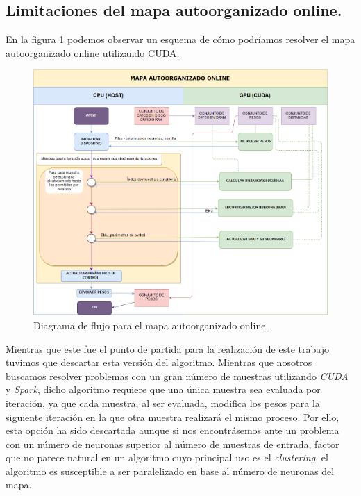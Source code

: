\subsection{Limitaciones del mapa autoorganizado online.}
En la figura \ref{img:somonline} podemos observar un esquema de cómo podríamos resolver el mapa autoorganizado online utilizando CUDA.

\begin{figure}[ht]
\centering
\includegraphics[scale=0.35]{imagenes/flujosomonline.png}
\caption{Diagrama de flujo para el mapa autoorganizado online.}
\label{img:somonline}
\end{figure}

Mientras que este fue el punto de partida para la realización de este trabajo tuvimos que descartar esta versión del algoritmo. Mientras que nosotros buscamos resolver problemas con un gran número de muestras utilizando \textit{CUDA} y \textit{Spark}, dicho algoritmo requiere que una única muestra sea evaluada por iteración, ya que cada muestra, al ser evaluada, modifica los pesos para la siguiente iteración en la que otra muestra realizará el mismo proceso. Por ello, esta opción ha sido descartada aunque si nos encontrásemos ante un problema con un número de neuronas superior al número de muestras de entrada, factor que no parece natural en un algoritmo cuyo principal uso es el \textit{clustering}, el algoritmo es susceptible a ser paralelizado en base al número de neuronas del mapa. \\

